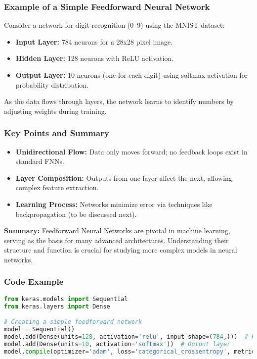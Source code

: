 \documentclass[aspectratio=169]{beamer}
\begin{document}
\begin{frame}[fragile]
    \frametitle{Example of a Simple Feedforward Neural Network}
    Consider a network for digit recognition (0–9) using the MNIST dataset:
    \begin{itemize}
        \item \textbf{Input Layer:} 784 neurons for a 28x28 pixel image.
        \item \textbf{Hidden Layer:} 128 neurons with ReLU activation.
        \item \textbf{Output Layer:} 10 neurons (one for each digit) using softmax activation for probability distribution.
    \end{itemize}
    As the data flows through layers, the network learns to identify numbers by adjusting weights during training.
\end{frame}

\begin{frame}[fragile]
    \frametitle{Key Points and Summary}
    \begin{itemize}
        \item \textbf{Unidirectional Flow:} Data only moves forward; no feedback loops exist in standard FNNs.
        \item \textbf{Layer Composition:} Outputs from one layer affect the next, allowing complex feature extraction.
        \item \textbf{Learning Process:} Networks minimize error via techniques like backpropagation (to be discussed next).
    \end{itemize}
    
    \textbf{Summary:} 
    Feedforward Neural Networks are pivotal in machine learning, serving as the basis for many advanced architectures. Understanding their structure and function is crucial for studying more complex models in neural networks.
\end{frame}

\begin{frame}[fragile]
    \frametitle{Code Example}
    \begin{lstlisting}[language=Python]
from keras.models import Sequential
from keras.layers import Dense

# Creating a simple feedforward network
model = Sequential()
model.add(Dense(units=128, activation='relu', input_shape=(784,)))  # Hidden layer
model.add(Dense(units=10, activation='softmax'))  # Output layer
model.compile(optimizer='adam', loss='categorical_crossentropy', metrics=['accuracy'])
    \end{lstlisting}
\end{frame}
\end{document}
